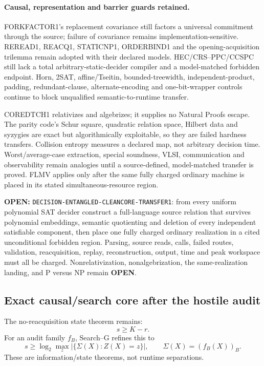 \documentclass[11pt]{article}
\begin{document}
\paragraph{Causal, representation and barrier guards retained.}
FORKFACTOR1's replacement covariance still factors a universal commitment
through the source; failure of covariance remains implementation-sensitive.
REREAD1, REACQ1, STATICNP1, ORDERBIND1 and the opening-acquisition trilemma
remain adopted with their declared models.  HEC/CRS--PPC/CCSPC still lack a
total arbitrary-static-decider compiler and a model-matched forbidden
endpoint.  Horn, 2SAT, affine/Tseitin, bounded-treewidth, independent-product,
padding, redundant-clause, alternate-encoding and one-bit-wrapper controls
continue to block unqualified semantic-to-runtime transfer.

COREDTCH1 relativizes and algebrizes; it supplies no Natural Proofs escape.
The parity code's Schur square, quadratic relation space, Hilbert data and
syzygies are exact but algorithmically exploitable, so they are failed
hardness transfers.  Collision entropy measures a declared map, not arbitrary
decision time.  Worst/average-case extraction, special soundness, VLSI,
communication and observability remain analogies until a source-defined,
model-matched transfer is proved.  FLMV applies only after the same fully
charged ordinary machine is placed in its stated simultaneous-resource
region.

\textbf{OPEN:} \texttt{DECISION-ENTANGLED-CLEANCORE-TRANSFER1}: from every
uniform polynomial SAT decider construct a full-language source relation that
survives polynomial embeddings, semantic quotienting and deletion of every
independent satisfiable component, then place one fully charged ordinary
realization in a cited unconditional forbidden region.  Parsing, source
reads, calls, failed routes, validation, reacquisition, replay,
reconstruction, output, time and peak workspace must all be charged.
Nonrelativization, nonalgebrization, the same-realization landing, and
P versus NP remain \textbf{OPEN}.

\subsection{Exact causal/search core after the hostile audit}

The no-reacquisition state theorem remains:
\[
\boxed{s\ge K-r.}
\]
For an audit family \(f_B\), Search--G refines this to
\[
\boxed{
s\ge
\log_2\max_z
\left|\{\Sigma(X):Z(X)=z\}\right|,
\qquad
\Sigma(X)=(f_B(X))_B.
}
\]
These are information/state theorems, not runtime separations.
\end{document}
